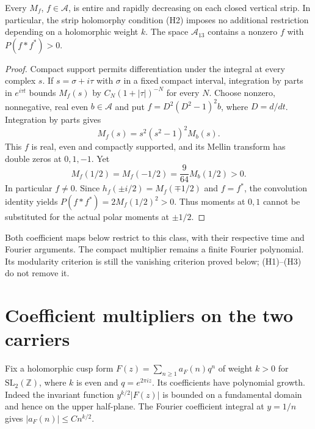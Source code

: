 \begin{proposition}
\label{v4-arith:pres57:moment-polar}
Every $M_f$, $f\in\mathscr A$, is entire and rapidly decreasing
on each closed vertical strip. In particular, the strip holomorphy
condition (H2) imposes no additional restriction depending on a
holomorphic weight $k$.
The space $\mathscr A_{13}$ contains a nonzero $f$ with
$P(f*f^*)>0$.
\end{proposition}
\begin{proof}
Compact support permits differentiation under the integral at every
complex $s$. If $s=\sigma+i\tau$ with $\sigma$ in a fixed compact
interval, integration by parts in $e^{i\tau t}$ bounds $M_f(s)$ by
$C_N(1+|\tau|)^{-N}$ for every $N$.
Choose nonzero, nonnegative, real even $b\in\mathscr A$ and put
$f=D^2(D^2-1)^2b$, where $D=d/dt$. Integration by parts gives
\[
 M_f(s)=s^2(s^2-1)^2M_b(s).
\]
This $f$ is real, even and compactly supported, and its Mellin
transform has double zeros at $0,1,-1$. Yet
\[
 M_f(1/2)=M_f(-1/2)=\frac9{64}M_b(1/2)>0.
\]
In particular $f\ne0$. Since $h_f(\pm i/2)=M_f(\mp1/2)$ and
$f=f^*$, the convolution identity yields
$P(f*f^*)=2M_f(1/2)^2>0$.
Thus moments at $0,1$ cannot be substituted for the actual polar
moments at $\pm1/2$.
\end{proof}

Both coefficient maps below restrict to this class, with their
respective time and Fourier arguments. The compact multiplier
remains a finite Fourier polynomial. Its modularity criterion is
still the vanishing criterion proved below; (H1)--(H3) do not remove it.

\section{Coefficient multipliers on the two carriers}
\label{v4-arith:w5-a:mellin-lift}

Fix a holomorphic cusp form $F(z)=\sum_{n\ge1}a_F(n)q^n$ of weight
$k>0$ for $\mathrm{SL}_2(\mathbb Z)$, where $k$ is even and $q=e^{2\pi iz}$.
Its coefficients have polynomial growth. Indeed the invariant
function $y^{k/2}|F(z)|$ is bounded on a fundamental domain and
hence on the upper half-plane. The Fourier coefficient integral
at $y=1/n$ gives $|a_F(n)|\le C n^{k/2}$.

